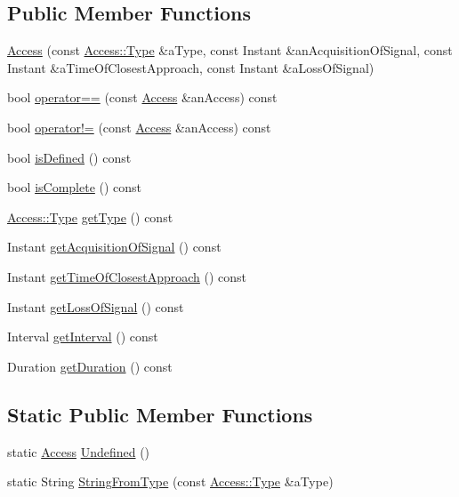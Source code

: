 \subsection*{Public Member Functions}
\begin{DoxyCompactItemize}
\item 
\hyperlink{classlibrary_1_1astro_1_1_access_af2542e9455c11aba9c51e2daa58c8cf5}{Access} (const \hyperlink{classlibrary_1_1astro_1_1_access_a2574b0e3f1e5ecca60471ccd04b9ff45}{Access\+::\+Type} \&a\+Type, const Instant \&an\+Acquisition\+Of\+Signal, const Instant \&a\+Time\+Of\+Closest\+Approach, const Instant \&a\+Loss\+Of\+Signal)
\item 
bool \hyperlink{classlibrary_1_1astro_1_1_access_ab12fea44326fdfb5964ea150346c15b5}{operator==} (const \hyperlink{classlibrary_1_1astro_1_1_access}{Access} \&an\+Access) const
\item 
bool \hyperlink{classlibrary_1_1astro_1_1_access_a52c9c55cb218da2c48f6acbf0d0e253c}{operator!=} (const \hyperlink{classlibrary_1_1astro_1_1_access}{Access} \&an\+Access) const
\item 
bool \hyperlink{classlibrary_1_1astro_1_1_access_aa279bacef1cedbb192650d664cb34650}{is\+Defined} () const
\item 
bool \hyperlink{classlibrary_1_1astro_1_1_access_a31ec7241cb46fb72944ff1330af03e4b}{is\+Complete} () const
\item 
\hyperlink{classlibrary_1_1astro_1_1_access_a2574b0e3f1e5ecca60471ccd04b9ff45}{Access\+::\+Type} \hyperlink{classlibrary_1_1astro_1_1_access_a0fc89884595bd05319a7312185307e87}{get\+Type} () const
\item 
Instant \hyperlink{classlibrary_1_1astro_1_1_access_aa0f6496f4b93c9aea2dec36da7a86ae6}{get\+Acquisition\+Of\+Signal} () const
\item 
Instant \hyperlink{classlibrary_1_1astro_1_1_access_a3bb25f3f8aa98d60aff7d27f86a53a70}{get\+Time\+Of\+Closest\+Approach} () const
\item 
Instant \hyperlink{classlibrary_1_1astro_1_1_access_ad1da49c813a7d581caec8a06d9650f38}{get\+Loss\+Of\+Signal} () const
\item 
Interval \hyperlink{classlibrary_1_1astro_1_1_access_ab67be20263e4fa49288af5e98f20d9e7}{get\+Interval} () const
\item 
Duration \hyperlink{classlibrary_1_1astro_1_1_access_a01b90c2ed9911ace029b10bcacb477c8}{get\+Duration} () const
\end{DoxyCompactItemize}
\subsection*{Static Public Member Functions}
\begin{DoxyCompactItemize}
\item 
static \hyperlink{classlibrary_1_1astro_1_1_access}{Access} \hyperlink{classlibrary_1_1astro_1_1_access_a00f9162943f30995d177a46eb79068a4}{Undefined} ()
\item 
static String \hyperlink{classlibrary_1_1astro_1_1_access_a3b55776350970c505c39b0a4224be87b}{String\+From\+Type} (const \hyperlink{classlibrary_1_1astro_1_1_access_a2574b0e3f1e5ecca60471ccd04b9ff45}{Access\+::\+Type} \&a\+Type)
\end{DoxyCompactItemize}
